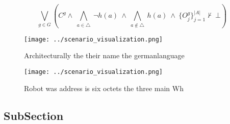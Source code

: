 \documentclass[a4paper]{article}
\begin{document}
\[\bigvee_{g\in G} (C^g \wedge\ \bigwedge_{a\in \triangle}\ \neg h(a)\ \wedge\ \bigwedge_{a\notin \triangle}\ h(a)\ \wedge\ \{O_j^g\}_{j=1}^{|A|} \nvdash\ \bot )\]

\begin{figure}
\centering
\texttt{[image: ../scenario\_visualization.png]}
\caption{Architecturally the their name the germanlanguage
}
\end{figure}
 
\begin{figure}
\centering
\texttt{[image: ../scenario\_visualization.png]}
\caption{Robot was address is six octets the three main Wh
}
\end{figure}
 
\subsection{SubSection}
\end{document}
